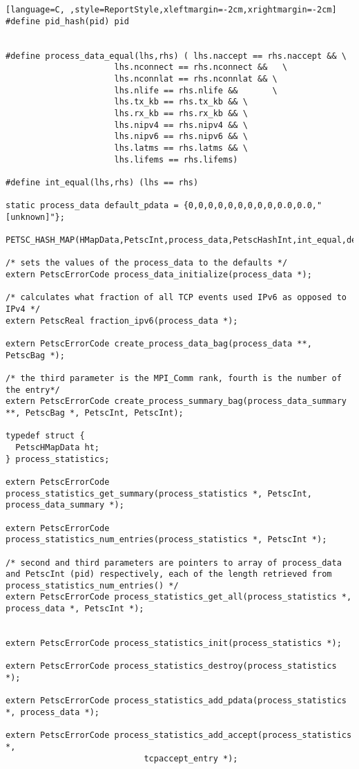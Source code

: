 \documentclass[11pt]{article}
\begin{document}
\begin{lstlisting}[language=C, ,style=ReportStyle,xleftmargin=-2cm,xrightmargin=-2cm]
#define pid_hash(pid) pid


#define process_data_equal(lhs,rhs) ( lhs.naccept == rhs.naccept && \
				      lhs.nconnect == rhs.nconnect &&	\
				      lhs.nconnlat == rhs.nconnlat && \
				      lhs.nlife == rhs.nlife &&	      \
				      lhs.tx_kb == rhs.tx_kb && \
				      lhs.rx_kb == rhs.rx_kb &&	\
				      lhs.nipv4 == rhs.nipv4 && \
				      lhs.nipv6 == rhs.nipv6 && \
				      lhs.latms == rhs.latms && \
				      lhs.lifems == rhs.lifems)

#define int_equal(lhs,rhs) (lhs == rhs)

static process_data default_pdata = {0,0,0,0,0,0,0,0,0,0.0,0.0,"[unknown]"};

PETSC_HASH_MAP(HMapData,PetscInt,process_data,PetscHashInt,int_equal,default_pdata);

/* sets the values of the process_data to the defaults */
extern PetscErrorCode process_data_initialize(process_data *);

/* calculates what fraction of all TCP events used IPv6 as opposed to IPv4 */
extern PetscReal fraction_ipv6(process_data *);

extern PetscErrorCode create_process_data_bag(process_data **, PetscBag *);

/* the third parameter is the MPI_Comm rank, fourth is the number of the entry*/
extern PetscErrorCode create_process_summary_bag(process_data_summary **, PetscBag *, PetscInt, PetscInt);

typedef struct {
  PetscHMapData ht;
} process_statistics;

extern PetscErrorCode process_statistics_get_summary(process_statistics *, PetscInt, process_data_summary *);

extern PetscErrorCode process_statistics_num_entries(process_statistics *, PetscInt *);

/* second and third parameters are pointers to array of process_data and PetscInt (pid) respectively, each of the length retrieved from process_statistics_num_entries() */
extern PetscErrorCode process_statistics_get_all(process_statistics *, process_data *, PetscInt *);


extern PetscErrorCode process_statistics_init(process_statistics *);

extern PetscErrorCode process_statistics_destroy(process_statistics *);

extern PetscErrorCode process_statistics_add_pdata(process_statistics *, process_data *);

extern PetscErrorCode process_statistics_add_accept(process_statistics *,
						    tcpaccept_entry *);


\end{lstlisting}
\end{document}
